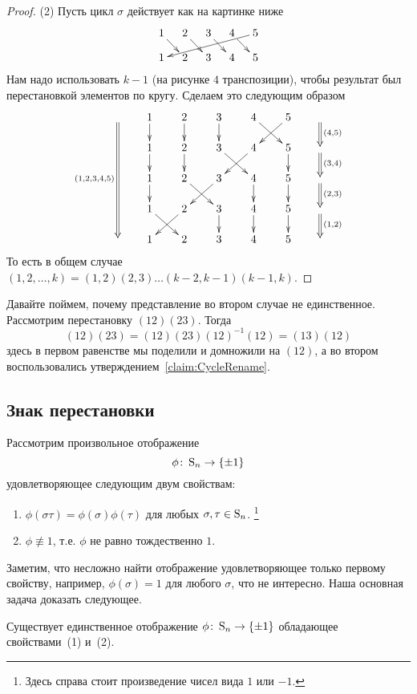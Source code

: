 \begin{proof}
(2) Пусть цикл $\sigma$ действует как на картинке ниже
\[
\xymatrix@R=10pt@C=10pt{
  {1}\ar[dr]&{2}\ar[dr]&{3}\ar[dr]&{4}\ar[dr]&{5}\ar[dllll]\\
  {1}&{2}&{3}&{4}&{5}\\
}
\]
Нам надо использовать $k-1$ (на рисунке $4$ транспозиции), чтобы результат был перестановкой элементов по кругу.
Сделаем это следующим образом
\[
\xymatrix@R=15pt@C=20pt{
  {}\ar@{=>}_{(1,2,3,4,5)}[dddd]&{1}\ar[d]&{2}\ar[d]&{3}\ar[d]&{4}\ar[dr]&{5}\ar[dl]&{}\ar@{=>}[d]^{(4,5)}\\
  {}&{1}\ar[d]&{2}\ar[d]&{3}\ar[dr]&{4}\ar[dl]&{5}\ar[d]&{}\ar@{=>}[d]^{(3,4)}\\
  {}&{1}\ar[d]&{2}\ar[dr]&{3}\ar[dl]&{4}\ar[d]&{5}\ar[d]&{}\ar@{=>}[d]^{(2,3)}\\
  {}&{1}\ar[dr]&{2}\ar[dl]&{3}\ar[d]&{4}\ar[d]&{5}\ar[d]&{}\ar@{=>}[d]^{(1,2)}\\
  {}&{1}&{2}&{3}&{4}&{5}&{}\\
}
\]
То есть в общем случае $(1,2,\ldots,k) = (1,2)(2,3)\ldots(k-2,k-1)(k-1,k)$.

\end{proof}

Давайте поймем, почему представление во втором случае не единственное.
Рассмотрим перестановку $(12)(23)$.
Тогда
\[
(12)(23) = (12)(23)(12)^{-1}(12) = (13)(12)
\]
здесь в первом равенстве мы поделили и домножили на $(12)$, а во втором воспользовались утверждением~\ref{claim:CycleRename}.

\subsection{Знак перестановки}

Рассмотрим произвольное отображение 
\[
\phi\colon \operatorname{S}_{n}\to \{\pm 1\}
\]
удовлетворяющее следующим двум свойствам:
\begin{enumerate}
\item $\phi(\sigma \tau) = \phi(\sigma)\phi(\tau)$ для любых $\sigma, \tau \in\operatorname{S}_{n}$.%
\footnote{Здесь справа стоит произведение чисел вида $1$ или $-1$.}

\item $\phi\not\equiv 1$, т.е. $\phi$ не равно тождественно $1$.
\end{enumerate}
Заметим, что несложно найти отображение удовлетворяющее только первому свойству, например, $\phi(\sigma) = 1$ для любого $\sigma$, что не интересно.
Наша основная задача доказать следующее.

\begin{claim}
Существует единственное отображение $\phi\colon \operatorname{S}_{n} \to \{\pm 1\}$ обладающее свойствами~(1) и~(2).
\end{claim}

